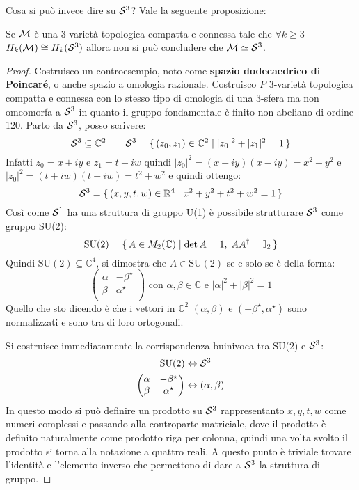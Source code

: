 Cosa si può invece dire su $ \mathcal{S}^{3} $? Vale la seguente proposizione:
\begin{proposition}
  Se $ \mathcal{M} $ è una $ 3 $-varietà topologica compatta e connessa tale che $ \forall k \geq 3 $
  $ H_k(\mathcal{M}) \cong H_k(\mathcal{S}^{3}) $ allora non si può concludere che $ \mathcal{M} \simeq \mathcal{S}^{3} $.
\end{proposition}
\begin{proof}
  Costruisco un controesempio, noto come \textbf{spazio dodecaedrico di Poincaré},
  o anche spazio a omologia razionale.
  Costruisco $ P $ $ 3 $-varietà topologica compatta e connessa con lo stesso tipo di omologia di
  una $ 3 $-sfera ma non omeomorfa a $ \mathcal{S}^{3} $ in quanto il gruppo fondamentale è finito
  non abeliano di ordine 120.
  Parto da $ \mathcal{S}^{3} $, posso scrivere:
  \[
    \mathcal{S}^{3} \subseteq \mathbb{C}^2 \qquad \mathcal{S}^{3} = \set{ (z_0, z_1) \in \mathbb{C}^2 | |z_0|^2 + |z_1|^2 = 1}
  \]
  Infatti $ z_0 = x + i y $ e $ z_1 = t + i w $ quindi $ |z_0|^2 = (x + iy)(x - iy) = x^2 + y^2 $
  e $ |z_0|^2 = (t + iw)(t - iw) = t^2 + w^2 $ e quindi ottengo:
  \[
    \mathcal{S}^{3} = \set{ (x,y,t,w) \in \mathbb{R}^{4} | x^2 + y^2 + t^2 + w^2 = 1}
  \]
  Così come $ \mathcal{S}^{1} $ ha una struttura di gruppo U(1) è possibile strutturare
  $ \mathcal{S}^{3} $ come gruppo SU(2):
  \[
    \mathrm{SU(2)} = \set{A \in M_2(\mathbb{C}) | \det{A} = 1, \; AA^\dagger = \mathbb{I}_{2}}
  \]
  Quindi $ \mathrm{SU(2)} \subseteq \mathbb{C}^4 $, si dimostra che $ A \in \mathrm{SU(2)} $ se e solo se
  è della forma:
  \[
    \begin{pmatrix}
      \alpha & - \beta^\star \\
      \beta & \alpha^\star \\
    \end{pmatrix}
    \text{ con } \alpha,\beta \in \mathbb{C} \text{ e } |\alpha|^2 + |\beta|^2 = 1
  \]
  Quello che sto dicendo è che i vettori in $ \mathbb{C}^2 $ $ (\alpha, \beta) $ e $ (-\beta^\star, \alpha^\star) $ sono
  normalizzati e sono tra di loro ortogonali.

  Si costruisce immediatamente la corrispondenza buinivoca tra SU(2) e $ \mathcal{S}^{3} $:
  \begin{align*}
    \mathrm{SU(2)} & \leftrightarrow \mathcal{S}^{3} \\
    \begin{pmatrix}
      \alpha & - \beta^\star \\
      \beta & \alpha^\star \\
    \end{pmatrix} & \leftrightarrow (\alpha,\beta)
  \end{align*}
  In questo modo si può definire un prodotto su $ \mathcal{S}^{3} $ rappresentanto
  $ x,y,t,w $ come numeri complessi e passando alla controparte matriciale, dove
  il prodotto è definito naturalmente come prodotto riga per colonna, quindi
  una volta svolto il prodotto si torna alla notazione a quattro reali. A questo
  punto è triviale trovare l'identità e l'elemento inverso che permettono di dare
  a $ \mathcal{S}^{3} $ la struttura di gruppo.


\end{proof}
